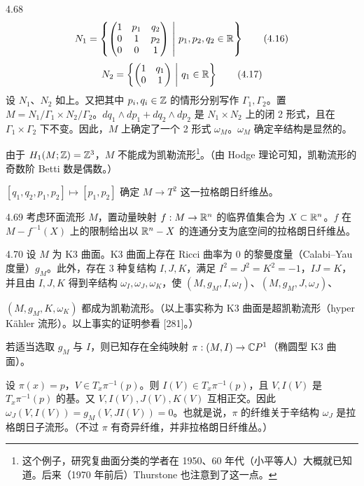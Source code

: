 \begin{example}{4.68}
  \begin{equation}
    N_1=\left\{\begin{pmatrix}1&p_1&q_2\\0&1&p_2\\0&0&1\end{pmatrix}\ \middle|\ p_1,p_2,q_2\in\R\right\} \tag{4.16}
  \end{equation}
  \begin{equation}
    N_2=\left\{\begin{pmatrix}1&q_1\\0&1\end{pmatrix}\ \middle|\ q_1\in\R\right\} \tag{4.17}
  \end{equation}
  设 $N_1$、$N_2$ 如上。又把其中 $p_i,q_i\in\mathbb{Z}$ 的情形分别写作 $\Gamma_1,\Gamma_2$。置 $M=N_1/\Gamma_1\times N_2/\Gamma_2$。$dq_1\wedge dp_1+dq_2\wedge dp_2$ 是 $N_1\times N_2$ 上的闭 2 形式，且在 $\Gamma_1\times\Gamma_2$ 下不变。因此，$M$ 上确定了一个 2 形式 $\omega_M$。$\omega_M$ 确定辛结构是显然的。

  由于 $H_1(M;\mathbb{Z})=\mathbb{Z}^3$，$M$ 不能成为凯勒流形\footnote{这个例子，研究复曲面分类的学者在 1950、60 年代（小平等人）大概就已知道。后来（1970 年前后）Thurstone 也注意到了这一点。}。（由 Hodge 理论可知，凯勒流形的奇数阶 Betti 数是偶数。）

  $[q_1,q_2,p_1,p_2]\mapsto[p_1,p_2]$ 确定 $M\to T^2$ 这一拉格朗日纤维丛。
\end{example}

\begin{example}{4.69}
  考虑环面流形 $M$，置动量映射 $f:M\to\mathbb{R}^n$ 的临界值集合为 $X\subset\mathbb{R}^n$。$f$ 在 $M-f^{-1}(X)$ 上的限制给出以 $\mathbb{R}^n-X$ 的连通分支为底空间的拉格朗日纤维丛。
\end{example}

\begin{example}{4.70}
  设 $M$ 为 K3 曲面。K3 曲面上存在 Ricci 曲率为 0 的黎曼度量（Calabi–Yau 度量）$g_M$。此外，存在 3 种复结构 $I,J,K$，满足 $I^2=J^2=K^2=-1$，$IJ=K$，并且由 $I,J,K$ 得到辛结构 $\omega_I,\omega_J,\omega_K$，使 $(M,g_M,I,\omega_I)$、$(M,g_M,J,\omega_J)$、

  $(M,g_M,K,\omega_K)$ 都成为凯勒流形。（以上事实称为 K3 曲面是超凯勒流形（hyper Kähler 流形）。以上事实的证明参看 [281]。）

  若适当选取 $g_M$ 与 $I$，则已知存在全纯映射 $\pi:(M,I)\to\mathbb{C}P^1$（椭圆型 K3 曲面）。

  设 $\pi(x)=p$，$V\in T_x\pi^{-1}(p)$。则 $I(V)\in T_x\pi^{-1}(p)$，且 $V,I(V)$ 是 $T_x\pi^{-1}(p)$ 的基。又 $V,I(V),J(V),K(V)$ 互相正交。因此 $\omega_J(V,I(V))=g_M(V,JI(V))=0$。也就是说，$\pi$ 的纤维关于辛结构 $\omega_J$ 是拉格朗日子流形。（不过 $\pi$ 有奇异纤维，并非拉格朗日纤维丛。）
\end{example}

